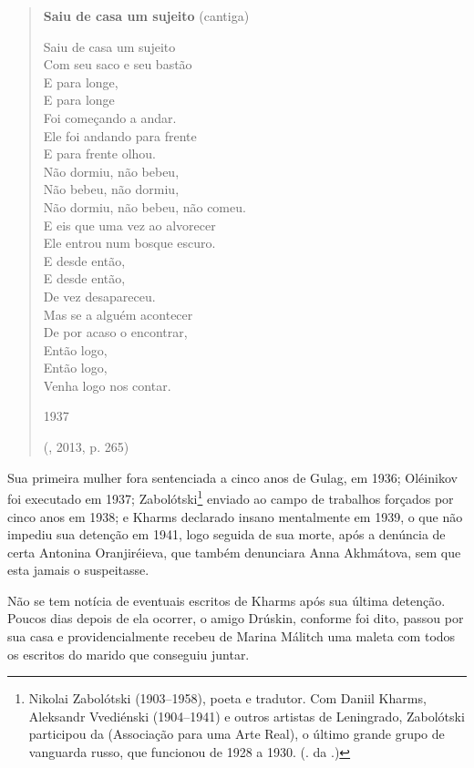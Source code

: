 \begin{verse}
\textbf{Saiu de casa um sujeito}
(cantiga)

Saiu de casa um sujeito\\
Com seu saco e seu bastão\\
E para longe,\\
E para longe\\
Foi começando a andar.\\[8pt]
Ele foi andando para frente\\
E para frente olhou.\\
Não dormiu, não bebeu,\\
Não bebeu, não dormiu,\\
Não dormiu, não bebeu, não comeu.\\[8pt]
E eis que uma vez ao alvorecer\\
Ele entrou num bosque escuro.\\
E desde então, \\
E desde então,\\
De vez desapareceu.\\[8pt]
Mas se a alguém acontecer\\
De por acaso o encontrar,\\
Então logo,\\
Então logo,\\
Venha logo nos contar.

1937

(, 2013, p. 265)

\end{verse}

Sua primeira mulher fora sentenciada a cinco anos de Gulag,
em 1936; Oléinikov foi executado em 1937; Zabolótski\footnote{Nikolai Zabolótski (1903--1958), poeta e tradutor. Com Daniil Kharms, Aleksandr Vvediénski (1904--1941) e outros artistas de Leningrado, Zabolótski participou da  (Associação para uma Arte Real), o último grande grupo de vanguarda russo, que funcionou de 1928 a 1930. (. da .)} enviado ao
campo de trabalhos forçados por cinco anos em 1938; e Kharms
declarado insano mentalmente em 1939, o que não impediu sua
detenção em 1941, logo seguida de sua morte, após a denúncia
de certa Antonina Oranjiréieva, que também denunciara Anna
Akhmátova, sem que esta jamais o suspeitasse.

Não se tem notícia de eventuais escritos de Kharms após sua
última detenção. Poucos dias depois de ela ocorrer, o amigo
Drúskin, conforme foi dito, passou por sua casa e
providencialmente recebeu de Marina Málitch uma maleta com
todos os escritos do marido que conseguiu juntar.

